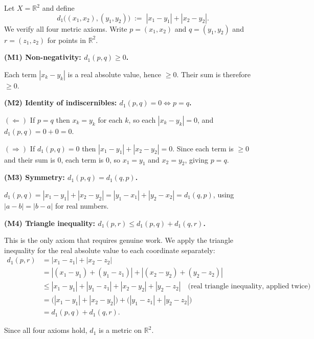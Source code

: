 \begin{example}
\label{ex:verify-taxicab-metric}
Let $X = \mathbb{R}^2$ and define
\[
d_1\bigl((x_1,x_2),(y_1,y_2)\bigr)
\;:=\;
|x_1 - y_1| + |x_2 - y_2|.
\]
We verify all four metric axioms.
Write $p = (x_1, x_2)$ and $q = (y_1, y_2)$ and $r = (z_1, z_2)$ for points in $\mathbb{R}^2$.

\medskip
\noindent\textbf{(M1) Non-negativity: $d_1(p, q) \ge 0$.}

Each term $|x_k - y_k|$ is a real absolute value, hence $\ge 0$.
Their sum is therefore $\ge 0$.
\checkmark

\medskip
\noindent\textbf{(M2) Identity of indiscernibles: $d_1(p, q) = 0 \iff p = q$.}

$(\Leftarrow)$ If $p = q$ then $x_k = y_k$ for each $k$, so each $|x_k - y_k| = 0$, and
$d_1(p, q) = 0 + 0 = 0$.

$(\Rightarrow)$ If $d_1(p,q) = 0$ then $|x_1 - y_1| + |x_2 - y_2| = 0$.
Since each term is $\ge 0$ and their sum is $0$, each term is $0$,
so $x_1 = y_1$ and $x_2 = y_2$, giving $p = q$.
\checkmark

\medskip
\noindent\textbf{(M3) Symmetry: $d_1(p, q) = d_1(q, p)$.}

$d_1(p,q) = |x_1 - y_1| + |x_2 - y_2| = |y_1 - x_1| + |y_2 - x_2| = d_1(q,p)$,
using $|a - b| = |b - a|$ for real numbers.
\checkmark

\medskip
\noindent\textbf{(M4) Triangle inequality: $d_1(p, r) \le d_1(p, q) + d_1(q, r)$.}

This is the only axiom that requires genuine work.
We apply the triangle inequality for the real absolute value to each coordinate separately:
\begin{align*}
d_1(p, r)
&= |x_1 - z_1| + |x_2 - z_2| \\
&= |(x_1 - y_1) + (y_1 - z_1)| + |(x_2 - y_2) + (y_2 - z_2)| \\
&\le |x_1 - y_1| + |y_1 - z_1| + |x_2 - y_2| + |y_2 - z_2|
     \quad\text{(real triangle inequality, applied twice)} \\
&= \bigl(|x_1 - y_1| + |x_2 - y_2|\bigr) + \bigl(|y_1 - z_1| + |y_2 - z_2|\bigr) \\
&= d_1(p, q) + d_1(q, r).
\end{align*}
\checkmark

Since all four axioms hold, $d_1$ is a metric on $\mathbb{R}^2$.
\end{example}

